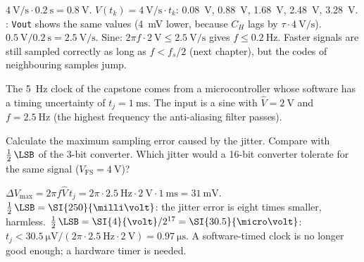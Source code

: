 \begin{solution}
\begin{talist}
\ta $\SI{4}{\volt\per\second}\cdot\SI{0.2}{\second} = \SI{0.8}{\volt}$.
\ta $V(t_k) = \SI{4}{\volt\per\second}\cdot t_k$: \SI{0.08}{\volt}, \SI{0.88}{\volt}, \SI{1.68}{\volt},
	\SI{2.48}{\volt}, \SI{3.28}{\volt}.
	\newline{}: \texttt{Vout} shows the same values (\SI{4}{\milli\volt} lower,
	because $C_H$ lags by $\tau\cdot\SI{4}{\volt\per\second}$).
\ta $\SI{0.5}{\volt}/\SI{0.2}{\second} = \SI{2.5}{\volt\per\second}$.
	Sine: $2\pi f\cdot\SI{2}{\volt} \leq \SI{2.5}{\volt\per\second}$ gives
	$f \leq \SI{0.2}{\hertz}$. Faster signals are still sampled correctly as long as
	$f < f_s/2$ (next chapter), but the codes of neighbouring samples jump.
\end{talist}
\end{solution}

\label{ex:sh-jitter}
The \SI{5}{\hertz} clock of the capstone comes from a microcontroller whose
software has a timing uncertainty of $t_j = \SI{1}{\milli\second}$. The input
is a sine with $\hat V = \SI{2}{\volt}$ and $f = \SI{2.5}{\hertz}$
(the highest frequency the anti-aliasing filter passes).
\begin{talist}
\ta Calculate the maximum sampling error caused by the jitter.
\ta Compare with $\frac12\,\LSB$ of the 3-bit converter.
\ta Which jitter would a 16-bit converter tolerate for the same signal
	($V_\mathrm{FS} = \SI{4}{\volt}$)?
\end{talist}

\begin{solution}
\begin{talist}
\ta $\Delta V_\mathrm{max} = 2\pi f\hat V\,t_j = 2\pi\cdot\SI{2.5}{\hertz}\cdot\SI{2}{\volt}\cdot\SI{1}{\milli\second}
	= \SI{31}{\milli\volt}$.
\ta $\frac12\,\LSB = \SI{250}{\milli\volt}$: the jitter error is eight times smaller, harmless.
\ta $\frac12\,\LSB = \SI{4}{\volt}/2^{17} = \SI{30.5}{\micro\volt}$:
	$t_j < \SI{30.5}{\micro\volt}/(2\pi\cdot\SI{2.5}{\hertz}\cdot\SI{2}{\volt}) = \SI{0.97}{\micro\second}$.
	A software-timed clock is no longer good enough; a hardware timer is needed.
\end{talist}
\end{solution}

